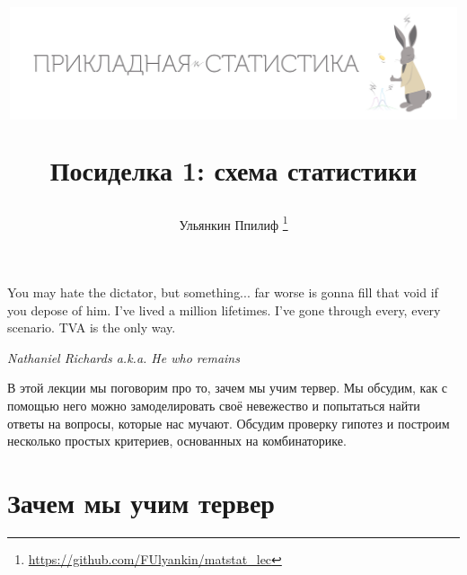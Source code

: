 \documentclass[12pt, a4paper, oneside]{article}
\title{
\begin{center} 
\includegraphics[width=0.99\textwidth]{logo.png}
\end{center}

Посиделка 1: схема статистики}
\date{ } %
\author{Ульянкин Ппилиф \thanks{\url{https://github.com/FUlyankin/matstat\_lec}}}
\begin{document}

\maketitle

\epigraph{You may hate the dictator, but something... far worse is gonna fill that void if you depose of him. I've lived a million lifetimes. I've gone through every, every scenario. TVA is the only way.}{\textit{Nathaniel Richards a.k.a. He who remains}}


В этой лекции мы поговорим про то, зачем мы учим тервер. Мы обсудим, как с помощью него можно замоделировать своё невежество и попытаться найти ответы на вопросы, которые нас мучают. Обсудим проверку гипотез и построим несколько простых критериев, основанных на комбинаторике.


\section{Зачем мы учим тервер}
\end{document}
